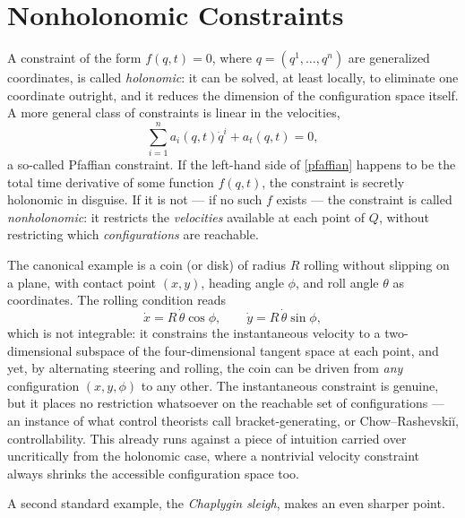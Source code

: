 \chapter{Nonholonomic Constraints}
\label{ch:nonholonomic}

A constraint of the form $f(q,t)=0$, where $q=(q^1,\dots,q^n)$ are
generalized coordinates, is called \emph{holonomic}: it can be
solved, at least locally, to eliminate one coordinate outright, and
it reduces the dimension of the configuration space itself. A more
general class of constraints is linear in the velocities,
\begin{equation}
  \sum_{i=1}^n a_i(q,t) \dot q^i + a_t(q,t) = 0,
  \label{pfaffian}
\end{equation}
a so-called Pfaffian constraint. If the left-hand side of
\eqref{pfaffian} happens to be the total time derivative of some
function $f(q,t)$, the constraint is secretly holonomic in disguise.
If it is not --- if no such $f$ exists --- the constraint is called
\emph{nonholonomic}: it restricts the \emph{velocities} available at
each point of $Q$, without restricting which \emph{configurations}
are reachable.

The canonical example is a coin (or disk) of radius $R$ rolling
without slipping on a plane, with contact point $(x,y)$, heading
angle $\phi$, and roll angle $\theta$ as coordinates. The
rolling condition reads
\begin{equation*}
  \dot x = R\,\dot\theta\cos\phi ,\qquad
  \dot y = R\,\dot\theta\sin\phi ,
\end{equation*}
which is not integrable: it constrains the instantaneous velocity to
a two-dimensional subspace of the four-dimensional tangent space at
each point, and yet, by alternating steering and rolling, the coin
can be driven from \emph{any} configuration $(x,y,\phi)$ to any
other. The instantaneous constraint is genuine, but it places no
restriction whatsoever on the reachable set of configurations --- an
instance of what control theorists call bracket-generating, or
Chow--Rashevski\u{i}, controllability. This already runs against a
piece of intuition carried over uncritically from the holonomic
case, where a nontrivial velocity constraint always shrinks the
accessible configuration space too.

A second standard example, the \emph{Chaplygin sleigh}, makes an
even sharper point.

